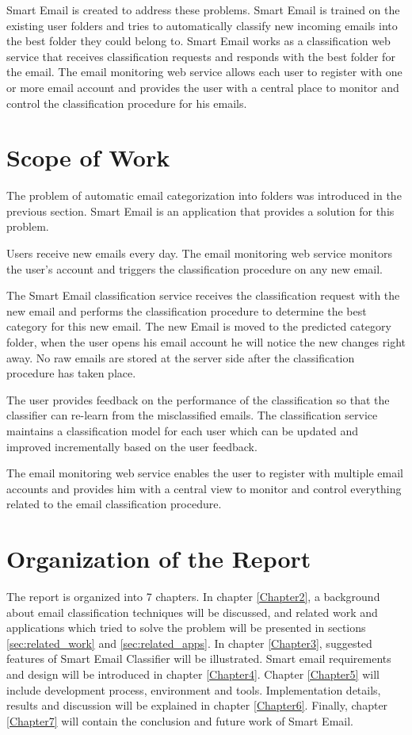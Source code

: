 Smart Email is created to address these problems. Smart Email is trained on the 
existing user folders and tries to automatically classify new incoming emails 
into the best folder they could belong to. Smart Email works as a classification
 web service that receives classification requests and responds with the best
folder for the email. The email monitoring web service allows each user to
 register with one or more email account and provides the user with a central place
 to monitor and control the classification procedure for his emails.

\section{Scope of Work}

The problem of automatic email categorization into folders was introduced
in the previous section. Smart Email is an application that provides a solution
for this problem.

Users receive new emails every day. The email monitoring web service monitors
 the user's account and triggers the classification procedure on any new email. 

The Smart Email classification service receives the classification request with the new email
 and performs the classification procedure to determine the best category for this new 
email. The new Email is moved to the predicted category folder, when the user 
opens his email account he will notice the new changes right away. No raw emails 
are stored at the server side after the classification procedure has taken place.

The user provides feedback on the performance of the classification so that the 
classifier can re-learn from the misclassified emails. The classification service maintains 
a classification model for each user which can be updated and improved incrementally 
based on the user feedback.

The email monitoring web service enables the user to register with multiple email accounts and 
provides him with a central view to monitor and control everything related to 
the email classification procedure.


\section{Organization of the Report}

The report is organized into 7 chapters. In chapter \ref{Chapter2}, a background 
about email classification techniques will be discussed, and related work and applications
which tried to solve the problem will be presented in sections \ref{sec:related_work} 
and \ref{sec:related_apps}. In chapter \ref{Chapter3}, suggested features of Smart 
Email Classifier will be illustrated.
Smart email requirements and design will be introduced in chapter \ref{Chapter4}.
Chapter \ref{Chapter5} will include development process, environment and tools. 
Implementation details, results and discussion will be explained in chapter \ref{Chapter6}. Finally,  
chapter \ref{Chapter7} will contain the conclusion and future work of Smart Email.


